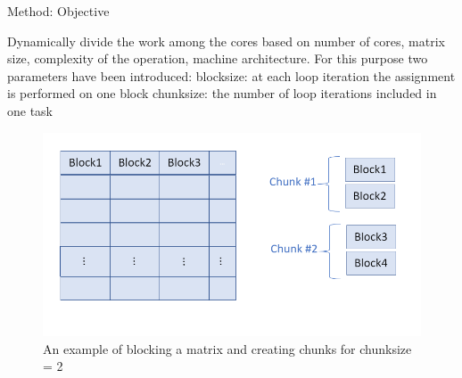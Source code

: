 \documentclass[10pt]{beamer}
\begin{document}



\begin{frame}{Method: Objective}
	\begin{outline}
		Dynamically divide the work among the cores based on number of cores, matrix size, complexity of the operation, machine architecture.
		For this purpose two parameters have been introduced:
		\1block\textunderscore size: at each loop iteration the assignment is performed on one block
		\1chunk\textunderscore size: the number of loop iterations included in one task 
		\begin{figure}
			\centering
			\includegraphics[width=0.72\linewidth]{images/chunks.png}
			\caption{An example of blocking a matrix and creating chunks for chunk\textunderscore size = 2}	
		\end{figure}	
	\end{outline}
\end{frame}
\end{document}
